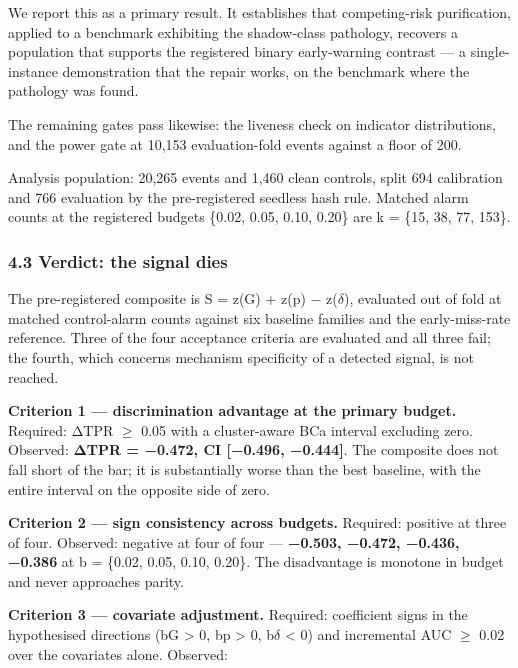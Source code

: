 \documentclass[
  11pt,
]{article}
\begin{document}
We report this as a primary result. It establishes that competing-risk
purification, applied to a benchmark exhibiting the shadow-class
pathology, recovers a population that supports the registered binary
early-warning contrast --- a single-instance demonstration that the
repair works, on the benchmark where the pathology was found.

The remaining gates pass likewise: the liveness check on indicator
distributions, and the power gate at 10,153 evaluation-fold events
against a floor of 200.

Analysis population: 20,265 events and 1,460 clean controls, split 694
calibration and 766 evaluation by the pre-registered seedless hash rule.
Matched alarm counts at the registered budgets \{0.02, 0.05, 0.10,
0.20\} are k = \{15, 38, 77, 153\}.

\subsubsection{4.3 Verdict: the signal
dies}\label{verdict-the-signal-dies}

The pre-registered composite is S = z(G) + z(p) − z(\(\delta\)),
evaluated out of fold at matched control-alarm counts against six
baseline families and the early-miss-rate reference. Three of the four
acceptance criteria are evaluated and all three fail; the fourth, which
concerns mechanism specificity of a detected signal, is not reached.

\textbf{Criterion 1 --- discrimination advantage at the primary budget.}
Required: ΔTPR \(\geq\) 0.05 with a cluster-aware BCa interval excluding
zero. Observed: \textbf{ΔTPR = −0.472, CI {[}−0.496, −0.444{]}}. The
composite does not fall short of the bar; it is substantially worse than
the best baseline, with the entire interval on the opposite side of
zero.

\textbf{Criterion 2 --- sign consistency across budgets.} Required:
positive at three of four. Observed: negative at four of four ---
\textbf{−0.503, −0.472, −0.436, −0.386} at b = \{0.02, 0.05, 0.10,
0.20\}. The disadvantage is monotone in budget and never approaches
parity.

\textbf{Criterion 3 --- covariate adjustment.} Required: coefficient
signs in the hypothesised directions (bG \textgreater{} 0, bp
\textgreater{} 0, b\(\delta\) \textless{} 0) and incremental AUC
\(\geq\) 0.02 over the covariates alone. Observed:
\end{document}
